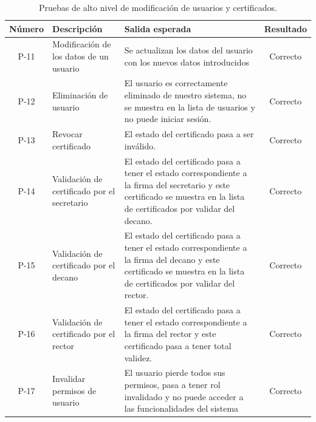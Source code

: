 
\begin{table}[!h]
	\begin{center}
		\begin{tabular}{|c|p{5cm}|p{5cm}|c|}
				\hline \textbf{Número} & \textbf{Descripción} & \textbf{Salida esperada} &  \textbf{Resultado}\\ 
				\hline P-11 & Modificación de los datos de un usuario &  Se actualizan los datos del usuario con los nuevos datos introducidos & Correcto \\
				\hline P-12 & Eliminación de usuario & El usuario es correctamente eliminado de nuestro sistema, no se muestra en la lista de usuarios y no puede iniciar sesión.  & Correcto \\
				\hline P-13 & Revocar certificado & El estado del certificado pasa a ser inválido. & Correcto \\
				\hline P-14 & Validación de certificado por el secretario & El estado del certificado pasa a tener el estado correspondiente a la firma del secretario y este certificado se muestra en la lista de certificados por validar del decano. & Correcto \\
				\hline P-15 & Validación de certificado por el decano & El estado del certificado pasa a tener el estado correspondiente a la firma del decano y este certificado se muestra en la lista de certificados por validar del rector. & Correcto \\
				\hline P-16 & Validación de certificado por el rector & El estado del certificado pasa a tener el estado correspondiente a la firma del rector y este certificado pasa a tener total validez. & Correcto \\
				\hline P-17 & Invalidar permisos de usuario & El usuario pierde todos sus permisos, pasa a tener rol invalidado y no puede acceder a las funcionalidades del sistema & Correcto \\
				\hline 
		\end{tabular}
		\caption{Pruebas de alto nivel de modificación de usuarios y certificados.}
		\label{tab:modifyTest}
	\end{center}
\end{table}

